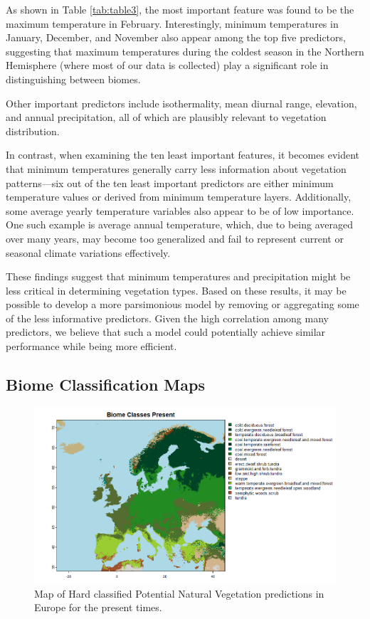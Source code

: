 \documentclass[
]{krantz}
\begin{document}
As shown in Table \ref{tab:table3}, the most important feature was found to be the maximum temperature in February. Interestingly, minimum temperatures in January, December, and November also appear among the top five predictors, suggesting that maximum temperatures during the coldest season in the Northern Hemisphere (where most of our data is collected) play a significant role in distinguishing between biomes.

Other important predictors include isothermality, mean diurnal range, elevation, and annual precipitation, all of which are plausibly relevant to vegetation distribution.

In contrast, when examining the ten least important features, it becomes evident that minimum temperatures generally carry less information about vegetation patterns---six out of the ten least important predictors are either minimum temperature values or derived from minimum temperature layers. Additionally, some average yearly temperature variables also appear to be of low importance. One such example is average annual temperature, which, due to being averaged over many years, may become too generalized and fail to represent current or seasonal climate variations effectively.

These findings suggest that minimum temperatures and precipitation might be less critical in determining vegetation types. Based on these results, it may be possible to develop a more parsimonious model by removing or aggregating some of the less informative predictors. Given the high correlation among many predictors, we believe that such a model could potentially achieve similar performance while being more efficient.

\subsection{Biome Classification Maps}\label{biome-classification-maps}

\begin{figure}

{\centering \includegraphics[width=1\linewidth]{work/05-naturalveg/figures/eu_pred_pres2_c} 

}

\caption{Map of Hard classified Potential Natural Vegetation  predictions in Europe for the present times.}\label{fig:mappres}
\end{figure}
\end{document}
